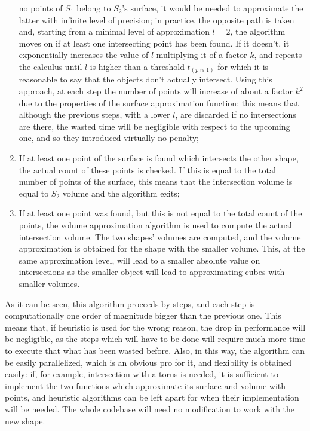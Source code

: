 \begin{enumerate}
{    no points of $S_1$ belong to $S_2$'s surface, it
    would be needed to approximate the latter with infinite level of
    precision; in practice, the opposite path is taken and, starting
    from a minimal level of approximation  $l=2$, the algorithm moves
    on if at least one intersecting point has been found. If it
    doesn't, it exponentially increases the value of $l$ multiplying
    it of a factor $k$, and repeats
    the calculus until $l$ is higher than a threshold
    $t_{(p\approx 1)}$ for which it is reasonable to say that the
    objects don't actually intersect. Using this approach, at each
    step the number of points will increase of about a factor $k^2$
    due to the properties of the surface approximation function; this
    means that although the previous steps, with a lower $l$, are
    discarded if no intersections are there, the wasted time will be
    negligible with respect to the upcoming one, and so they introduced virtually no penalty;}
  \item{If at least one point of the surface is found which intersects
    the other shape, the actual count of these points is checked. If
    this is equal to the total number of points of the surface,
    this means that the intersection volume is equal to $S_2$ volume
    and the algorithm exits;}
  \item{If at least one point was found, but this is not equal to the
    total count of the points, the volume approximation algorithm is used to compute the
    actual intersection volume. The two shapes' volumes are computed,
    and the volume approximation is obtained for the shape with the
    smaller volume. This, at the same approximation level, will lead
    to a smaller absolute value on intersections as the smaller object
    will lead to approximating cubes with smaller volumes.}
\end{enumerate}

As it can be seen, this algorithm proceeds by steps, and each step is
computationally one order of magnitude bigger than the previous
one. This means that, if heuristic is used for the wrong reason, the
drop in performance will be negligible, as the steps which will have
to be done will require much more time to execute that what has been
wasted before. Also, in this way, the algorithm can be easily
parallelized, which is an obvious pro for it, and flexibility is
obtained easily: if, for example, intersection with a torus is needed,
it is sufficient to implement the two functions which approximate its
surface and volume with points, and heuristic algorithms can be left
apart for when their implementation will be needed. The whole codebase
will need no modification to work with the new shape.

